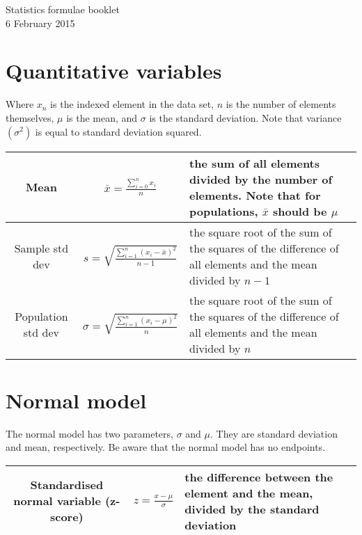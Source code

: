 \documentclass{article}
\begin{document}
\renewcommand{\arraystretch}{1.75}

\begin{center}
	\centering \LARGE Statistics formulae booklet \\[1ex]
	\centering \large 6 February 2015
\end{center}

\section{Quantitative variables}
Where $x_n$ is the indexed element in the data set, $n$ is the number of elements themselves, $\mu$ is the mean, and $\sigma$ is the standard deviation. Note that variance $\left(\sigma^2\right)$ is equal to standard deviation squared.
\begin{center}
\begin{tabular}{ c c m{6cm}} \hline
Mean & $\bar{x} = \frac{\sum^{n}_{i=0} x_i}{n}$ & the sum of all elements divided by the number of elements. Note that for populations, $\bar{x}$ should be $\mu$ \\ \hline
Sample std dev & $s = \sqrt{\frac{\sum^n_{i=1} \left ( x_i - \bar{x} \right) ^ 2}{n - 1}}$ & the square root of the sum of the squares of the difference of all elements and the mean divided by $n-1$ \\ \hline
Population std dev & $\sigma = \sqrt{\frac{\sum^n_{i=1} \left ( x_i - \mu \right) ^ 2}{n}}$ & the square root of the sum of the squares of the difference of all elements and the mean divided by $n$ \\ \hline
\end{tabular}
\end{center}

\section{Normal model}
The normal model has two parameters, $\sigma$ and $\mu$. They are standard deviation and mean, respectively. Be aware that the normal model has no endpoints.
\begin{center}
\begin{tabular}{ c c m{6cm} } \hline
Standardised normal variable (z-score) & $z = \frac{x -     \mu}{\sigma}$ & the difference between the element and the mean, divided by the standard deviation \\ \hline
\end{tabular}
\end{center}
\end{document}
